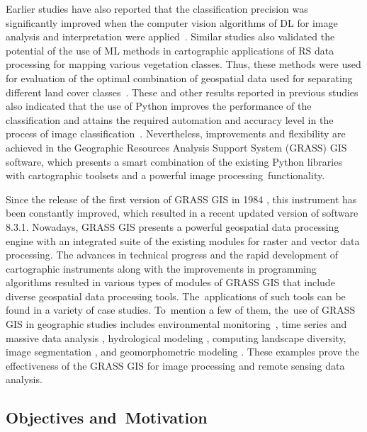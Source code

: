 \documentclass[coasts,article,accept,pdftex,oneauthor]{Definitions/mdpi}
\begin{document}
Earlier studies {have} also reported that {the} classification precision {was significantly} improved {when} the{ }computer vision algorithms of DL for image analysis and interpretation {were applied}~\cite{GUO20231,rs15215121,DOU2021102477}. Similar studies also validated the potential of the use of ML methods in cartographic{ }applications {of RS data processing }for mapping various vegetation classes{. Thus, these methods were used for evaluation of }the optimal combination of geospatial data {used }for separating different land cover classes~\cite{BOULILA2021106014,LIN2024102618}. These and other{ }results {reported in previous studies }also indicated that{ }the use of Python {improves the performance of} the classification and {attains} the required automation and accuracy level in {the process of }image classification~\cite{ROBERTS2022105192,GUO2023e21542,Redoloza}. Nevertheless, improvements and flexibility {are} achieved in the Geographic Resources Analysis Support System (GRASS) GIS software{, which} presents a smart combination of {the existing }Python libraries with cartographic toolsets and {a} powerful image processing~functionality. 

{Since the {release of the }first version of{ }GRASS GIS{ }in 1984} \cite{GRASS_GIS_software}, {{this} instrument has been constantly improved, which resulted in a {recent }updated version of software 8.3.1{. Nowadays, GRASS GIS presents} a powerful geospatial data processing engine {with an} integrated suite of {the }existing modules for raster and vector data processing. {The }advances in technical progress and the rapid development of cartographic instruments along with the {improvements} in programming algorithms resulted in various types of modules of GRASS GIS that include diverse geospatial data processing tools. The~applications of such tools {can be found} in a variety of case studies. To~mention a few of them, the~use of GRASS GIS in geographic studies includes environmental monitoring}~\cite{STRIGARO201668,Lemenkova202322}, {time series and massive data analysis} \cite{JASIEWICZ20111525,Lemenkova202313}, {hydrological modeling} \cite{JASIEWICZ20111162}, {computing landscape diversity, image segmentation} \cite{Lemenkova202320,ROCCHINI201382}, {and geomorphometric modeling} \cite{HOFIERKA2009387}. {These{ }examples{ }prove {the} effectiveness {of the GRASS GIS }for image processing and remote sensing data analysis.}

\subsection{Objectives and~Motivation}
\end{document}
